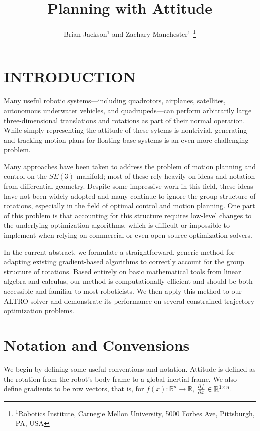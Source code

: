 \documentclass[letterpaper, 10 pt, conference]{ieeeconf}  %
\title{\LARGE \bf
Planning with Attitude
}
\author{Brian Jackson$^1$ and Zachary Manchester$^1$%
    \thanks{
        $^1$Robotics Institute, 
        Carnegie Mellon University, 
        5000 Forbes Ave, Pittsburgh, PA, USA
    }
}
\newcommand{\R}{\mathbb{R}}
\begin{document}
\maketitle

\section{INTRODUCTION} 

    Many useful robotic systems---including quadrotors, airplanes, satellites, autonomous
    underwater vehicles, and quadrupeds---can perform arbitrarily large three-dimensional
    translations and rotations as part of their normal operation. While simply
    representing the attitude of these sytems is nontrivial, generating and tracking
    motion plans for floating-base systems is an even more challenging problem.

    Many approaches have been taken to address the problem of motion planning and control
    on the $SE(3)$ manifold; most of these rely heavily on ideas and notation
    from differential geometry. Despite some impressive work in this field, these ideas
    have not been widely adopted and many continue to ignore the group structure of rotations,
    especially in the field of optimal control and motion planning. One part of this problem
    is that accounting for this structure requires low-level changes to the underlying
    optimization algorithms, which is difficult or impossible to implement when relying on
    commercial or even open-source optimization solvers.

    In the current abstract, we formulate a straightforward, generic method for adapting
    existing gradient-based algorithms to correctly account for the group structure of
    rotations. Based entirely on basic mathematical tools from linear algebra and
    calculus, our method is computationally efficient and should be both accessible and
    familiar to most roboticists. We then apply this method to our ALTRO solver
    \cite{howell2019altro} and demonstrate its performance on several constrained trajectory
    optimization problems.

\section{Notation and Convensions}

    We begin by defining some useful conventions and notation. 
    Attitude is defined as the rotation from the robot's body frame to a global inertial 
        frame. 
    We also define gradients to be row vectors, that is, for 
        $f(x) : \R^n \to \R$, $\pdv{f}{x} \in \R^{1\times n}$.
\end{document}
